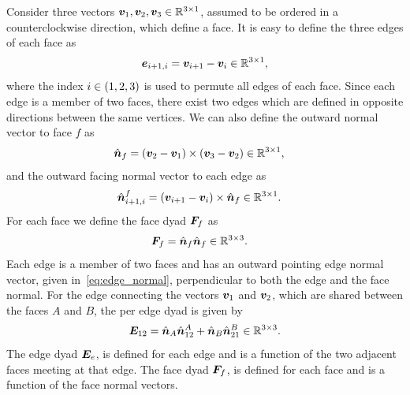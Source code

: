 \documentclass[]{aiaa-tc}%
\begin{document}
Consider three vectors \( \bm{v}_1, \bm{v}_2, \bm{v}_3 \in \mathbb{R}^{3 \times 1} \), assumed to be ordered in a counterclockwise direction, which define a face.
It is easy to define the three edges of each face as
\begin{align}\label{eq:edges}
    \bm{e}_{i+1,i} = \bm{v}_{i+1} - \bm{v}_i \in \mathbb{R}^{3 \times 1 },
\end{align}
where the index \( i \in \left( 1,2,3 \right) \) is used to permute all edges of each face.
Since each edge is a member of two faces, there exist two edges which are defined in opposite directions between the same vertices.
We can also define the outward normal vector to face \( f\)  as
\begin{align}\label{eq:face_normal}
    \hat{\bm{n}}_f &= \left( \bm{v}_{2} - \bm{v}_1 \right) \times \left( \bm{v}_{3} - \bm{v}_2 \right) \in \mathbb{R}^{3 \times 1},
\end{align}
and the outward facing normal vector to each edge as
\begin{align}\label{eq:edge_normal}
    \hat{\bm{n}}_{i+1,i}^f &= \left( \bm{v}_{i+1} - \bm{v}_i \right) \times \hat{\bm{n}}_f \in \mathbb{R}^{3 \times 1}.
\end{align}
For each face we define the face dyad \( \bm{F}_f \) as
\begin{align}\label{eq:face_dyad}
    \bm{F}_f &= \hat{\bm{n}}_f \hat{\bm{n}}_f \in \mathbb{R}^{3 \times 3}.
\end{align}
Each edge is a member of two faces and has an outward pointing edge normal vector, given in~\cref{eq:edge_normal}, perpendicular to both the edge and the face normal.
For the edge connecting the vectors \( \bm{v}_1 \) and \( \bm{v}_2 \), which are shared between the faces \(A\) and \( B\), the per edge dyad is given by
\begin{align}\label{eq:edge_dyad}
    \bm{E}_{12} = \hat{\bm{n}}_A \hat{\bm{n}}_{12}^A + \hat{\bm{n}}_B \hat{\bm{n}}_{21}^B \in \mathbb{R}^{3 \times 3}.
\end{align}
The edge dyad \( \bm{E}_e  \), is defined for each edge and is a function of the two adjacent faces meeting at that edge.
The face dyad \( \bm{F}_f \), is defined for each face and is a function of the face normal vectors.
\end{document}
